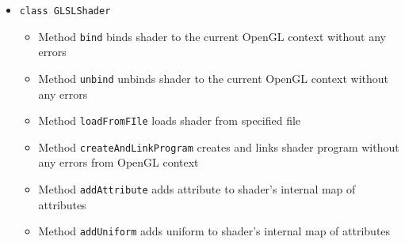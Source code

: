 \documentclass{report}
\begin{document}
\begin{itemize}
%
%	
\item \texttt{class GLSLShader}
		\begin{itemize}
			\item Method \texttt{bind} binds shader to the current OpenGL context without any errors
			\item Method \texttt{unbind} unbinds shader to the current OpenGL context without any errors
			\item Method \texttt{loadFromFIle} loads shader from specified file
			\item Method \texttt{createAndLinkProgram} creates and links shader program without any errors from OpenGL context
			\item Method \texttt{addAttribute} adds attribute to shader's internal map of attributes
			\item Method \texttt{addUniform} adds uniform to shader's internal map of attributes
		\end{itemize}
		
\end{itemize}
\end{document}
